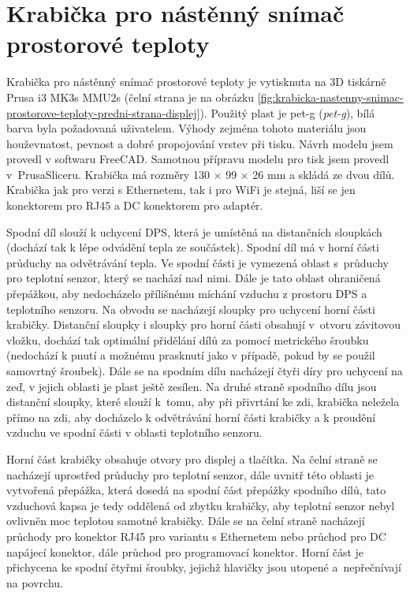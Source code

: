 \section{Krabička pro nástěnný snímač prostorové teploty}
\label{sec:krabicka-pro-nastenny-snimac-prostorove-teploty}
Krabička pro nástěnný snímač prostorové teploty je vytisknuta na 3D tiskárně Prusa i3 MK3s MMU2s (čelní strana je na obrázku \ref{fig:krabicka-nastenny-snimac-prostorove-teploty-predni-strana-displej}). Použitý plast je \acrshort{pet-g} (\textit{\acrlong{pet-g}}), bílá barva byla požadovaná uživatelem. Výhody zejména tohoto materiálu jsou houževnatost, pevnost a dobré propojování vrstev při tisku. Návrh modelu jsem provedl v softwaru FreeCAD. Samotnou přípravu modelu pro tisk jsem provedl v~PrusaSliceru. Krabička má rozměry 130 × 99 × 26 mm a skládá ze dvou dílů. Krabička jak pro verzi s Ethernetem, tak i pro WiFi je stejná, liší se jen konektorem pro RJ45 a DC konektorem pro adaptér.

Spodní díl slouží k uchycení DPS, která je umístěná na distančních sloupkách (dochází tak k lépe odvádění tepla ze součástek). Spodní díl má v horní části průduchy na odvětrávání tepla. Ve spodní části je vymezená oblast s~průduchy pro teplotní senzor, který se nachází nad nimi. Dále je tato oblast ohraničená přepážkou, aby nedocházelo přílišnému míchání vzduchu z prostoru DPS a teplotního senzoru. Na obvodu se nacházejí sloupky pro uchycení horní části krabičky. Distanční sloupky i sloupky pro horní části obsahují v~otvoru závitovou vložku, dochází tak optimální přidělání dílů za pomocí metrického šroubku (nedochází k pnutí a možnému prasknutí jako v případě, pokud by se použil samovrtný šroubek). Dále se na spodním dílu nacházejí čtyři díry pro uchycení na zeď, v jejich oblasti je plast ještě zesílen. Na druhé straně spodního dílu jsou distanční sloupky, které slouží k~tomu, aby při přivrtání ke zdi, krabička neležela přímo na zdi, aby docházelo k odvětrávání horní části krabičky a k proudění vzduchu ve spodní části v oblasti teplotního senzoru.

Horní část krabičky obsahuje otvory pro displej a tlačítka. Na čelní straně se nacházejí uprostřed průduchy pro teplotní senzor, dále uvnitř této oblasti je vytvořená přepážka, která dosedá na spodní část přepážky spodního dílů, tato vzduchová kapsa je tedy oddělená od zbytku krabičky, aby teplotní senzor nebyl ovlivněn moc teplotou samotné krabičky. Dále se na čelní straně nacházejí průchody pro konektor RJ45 pro variantu s Ethernetem nebo průchod pro DC napájecí konektor, dále průchod pro programovací konektor. Horní část je přichycena ke spodní čtyřmi šroubky, jejichž hlavičky jsou utopené a~nepřečnívají na povrchu.

